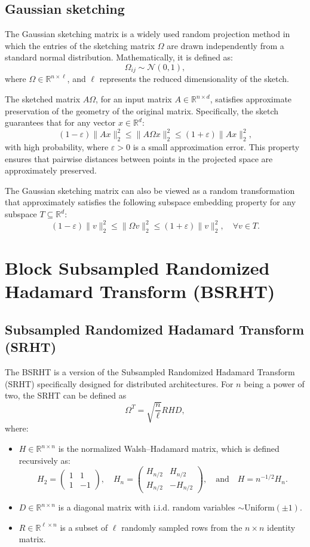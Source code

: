 \documentclass[a4paper, 12pt,oneside]{article}
\begin{document}
\subsection{Gaussian sketching }
The Gaussian sketching matrix is a widely used random projection method in which the entries of the sketching matrix $\Omega$ are drawn independently from a standard normal distribution. Mathematically, it is defined as:
\[
\Omega_{ij} \sim \mathcal{N}(0, 1),
\]
where $\Omega \in \mathbb{R}^{n \times \ell}$, and $\ell$ represents the reduced dimensionality of the sketch.

The sketched matrix $A\Omega$, for an input matrix $A \in \mathbb{R}^{n \times d}$, satisfies approximate preservation of the geometry of the original matrix. Specifically, the sketch guarantees that for any vector $x \in \mathbb{R}^d$:
\[
(1 - \varepsilon)\|A x\|_2^2 \leq \|A \Omega x\|_2^2 \leq (1 + \varepsilon)\|A x\|_2^2,
\]
with high probability, where $\varepsilon > 0$ is a small approximation error. This property ensures that pairwise distances between points in the projected space are approximately preserved.

The Gaussian sketching matrix can also be viewed as a random transformation that approximately satisfies the following subspace embedding property for any subspace $T \subseteq \mathbb{R}^d$:
\[
(1 - \varepsilon) \|v\|_2^2 \leq \|\Omega v\|_2^2 \leq (1 + \varepsilon) \|v\|_2^2, \quad \forall v \in T.
\]

\section{Block Subsampled Randomized Hadamard Transform (BSRHT)}

\subsection{Subsampled Randomized Hadamard Transform (SRHT)}
The BSRHT is a version of the Subsampled Randomized Hadamard Transform (SRHT) specifically designed for distributed architectures. For $n$ being a power of two, the SRHT can be defined as
\[
\Omega^T = \sqrt{\frac{n}{\ell}} RHD,
\]
where:
\begin{itemize}
  \item $H \in \mathbb{R}^{n \times n}$ is the normalized Walsh--Hadamard matrix, which is defined recursively as:
  \[
  H_2 = \begin{pmatrix} 1 & 1 \\
  1 & -1 \end{pmatrix}, \quad H_n = \begin{pmatrix} H_{n/2} & H_{n/2} \\
  H_{n/2} & -H_{n/2} \end{pmatrix}, \quad \text{and} \quad H = n^{-1/2} H_n.
  \]
  \item $D \in \mathbb{R}^{n \times n}$ is a diagonal matrix with i.i.d. random variables $\sim \text{Uniform}(\pm 1)$.
  \item $R \in \mathbb{R}^{\ell \times n}$ is a subset of $\ell$ randomly sampled rows from the $n \times n$ identity matrix.
\end{itemize}
\end{document}

